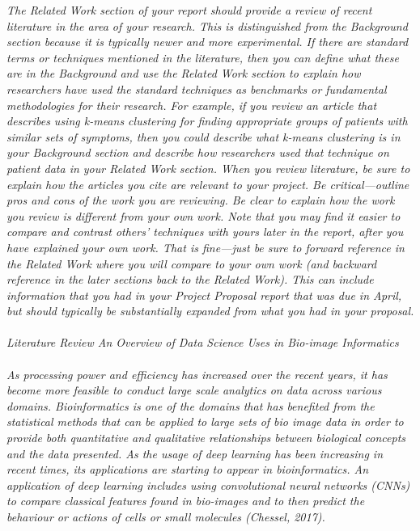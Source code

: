 \emph{The Related Work section of your report should provide a review of recent literature in the area of your research. This is distinguished from the Background section because it is typically newer and more experimental. If there are standard terms or techniques mentioned in the literature, then you can define what these are in the Background and use the Related Work section to explain how researchers have used the standard techniques as benchmarks or fundamental methodologies for their research. For example, if you review an article that describes using k-means clustering for finding appropriate groups of patients with similar sets of symptoms, then you could describe what k-means clustering is in your Background section and describe how researchers used that technique on patient data in your Related Work section. When you review literature, be sure to explain how the articles you cite are relevant to your project. Be critical---outline pros and cons of the work you are reviewing. Be clear to explain how the work you review is different from your own work. Note that you may find it easier to compare and contrast others' techniques with yours later in the report, after you have explained your own work. That is fine---just be sure to forward reference in the Related Work where you will compare to your own work (and backward reference in the later sections back to the Related Work). This can include information that you had in your Project Proposal report that was due in April, but should typically be substantially expanded from what you had in your proposal. \\ \\
Literature Review An Overview of Data Science Uses in Bio-image Informatics \\ \\
As processing power and efficiency has increased over the recent years, it has become more feasible to conduct large scale analytics on data across various domains. Bioinformatics is one of the domains that has benefited from the statistical methods that can be applied to large sets of bio image data in order to provide both quantitative and qualitative relationships between biological concepts and the data presented. As the usage of deep learning has been increasing in recent times, its applications are starting to appear in bioinformatics. An application of deep learning includes using convolutional neural networks (CNNs) to compare classical features found in bio-images and to then predict the behaviour or actions of cells or small molecules (Chessel, 2017). \\ \\
}
